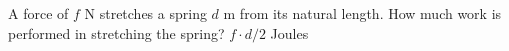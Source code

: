 {A force of $f$ N stretches a spring $d$ m from its natural length. How much work is performed in stretching the spring?}
{$f\cdot d/2$ Joules}
